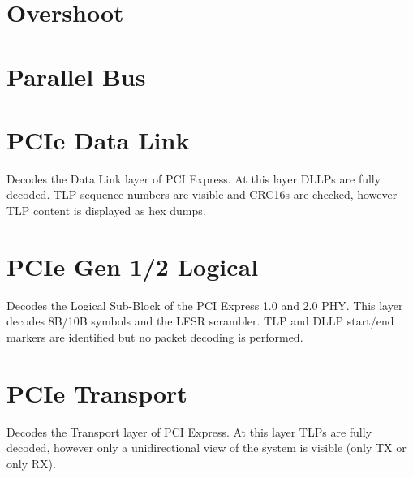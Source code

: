 \pagebreak
\section{Overshoot}

\pagebreak
\section{Parallel Bus}

\pagebreak
\section{PCIe Data Link}

Decodes the Data Link layer of PCI Express. At this layer DLLPs are fully decoded. TLP sequence numbers are visible
and CRC16s are checked, however TLP content is displayed as hex dumps.

\pagebreak
\section{PCIe Gen 1/2 Logical}

Decodes the Logical Sub-Block of the PCI Express 1.0 and 2.0 PHY. This layer decodes 8B/10B symbols and the LFSR
scrambler. TLP and DLLP start/end markers are identified but no packet decoding is performed.

\pagebreak
\section{PCIe Transport}

Decodes the Transport layer of PCI Express. At this layer TLPs are fully decoded, however only a unidirectional view
of the system is visible (only TX or only RX).

\pagebreak
